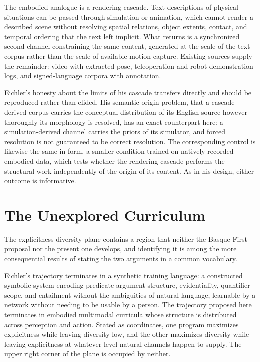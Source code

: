 \documentclass[11pt]{article}
\begin{document}
The embodied analogue is a rendering cascade. Text descriptions of physical situations can be passed through simulation or animation, which cannot render a described scene without resolving spatial relations, object extents, contact, and temporal ordering that the text left implicit. What returns is a synchronized second channel constraining the same content, generated at the scale of the text corpus rather than the scale of available motion capture. Existing sources supply the remainder: video with extracted pose, teleoperation and robot demonstration logs, and signed-language corpora with annotation.

Eichler's honesty about the limits of his cascade transfers directly and should be reproduced rather than elided. His semantic origin problem, that a cascade-derived corpus carries the conceptual distribution of its English source however thoroughly its morphology is resolved, has an exact counterpart here: a simulation-derived channel carries the priors of its simulator, and forced resolution is not guaranteed to be correct resolution. The corresponding control is likewise the same in form, a smaller condition trained on natively recorded embodied data, which tests whether the rendering cascade performs the structural work independently of the origin of its content. As in his design, either outcome is informative.


\section{The Unexplored Curriculum}
\label{sec:unexplored}

The explicitness-diversity plane contains a region that neither the Basque First proposal nor the present one develops, and identifying it is among the more consequential results of stating the two arguments in a common vocabulary.

Eichler's trajectory terminates in a synthetic training language: a constructed symbolic system encoding predicate-argument structure, evidentiality, quantifier scope, and entailment without the ambiguities of natural language, learnable by a network without needing to be usable by a person. The trajectory proposed here terminates in embodied multimodal curricula whose structure is distributed across perception and action. Stated as coordinates, one program maximizes explicitness while leaving diversity low, and the other maximizes diversity while leaving explicitness at whatever level natural channels happen to supply. The upper right corner of the plane is occupied by neither.
\end{document}
